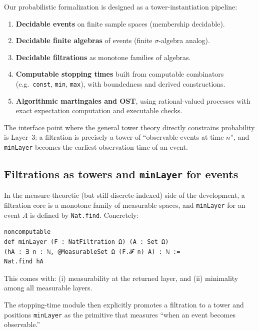 \documentclass[11pt]{article}
\begin{document}
Our probabilistic formalization is designed as a tower-instantiation pipeline:

\begin{enumerate}
\item \textbf{Decidable events} on finite sample spaces (membership decidable).
\item \textbf{Decidable finite algebras} of events (finite $\sigma$-algebra analog).
\item \textbf{Decidable filtrations} as monotone families of algebras.
\item \textbf{Computable stopping times} built from computable combinators (e.g.\ \texttt{const}, \texttt{min}, \texttt{max}), with boundedness and derived constructions.
\item \textbf{Algorithmic martingales and OST}, using rational-valued processes with exact expectation computation and executable checks.
\end{enumerate}

The interface point where the general tower theory directly constrains probability is Layer~3: a filtration is precisely a tower of ``observable events at time $n$'', and \texttt{minLayer} becomes the earliest observation time of an event.

\subsection{Filtrations as towers and \texttt{minLayer} for events}

In the measure-theoretic (but still discrete-indexed) side of the development, a filtration core is a monotone family of measurable spaces, and \texttt{minLayer} for an event $A$ is defined by \texttt{Nat.find}. Concretely:

\begin{lstlisting}[language={},caption={Lean: \texttt{minLayer} for $\mathbb N$-filtrations}]
noncomputable
def minLayer (F : NatFiltration Ω) (A : Set Ω)
(hA : ∃ n : ℕ, @MeasurableSet Ω (F.𝓕 n) A) : ℕ :=
Nat.find hA
\end{lstlisting}

This comes with:
(i) measurability at the returned layer, and (ii) minimality among all measurable layers. %

The stopping-time module then explicitly promotes a filtration to a tower and positions \texttt{minLayer} as the primitive that measures ``when an event becomes observable.'' %
\end{document}
